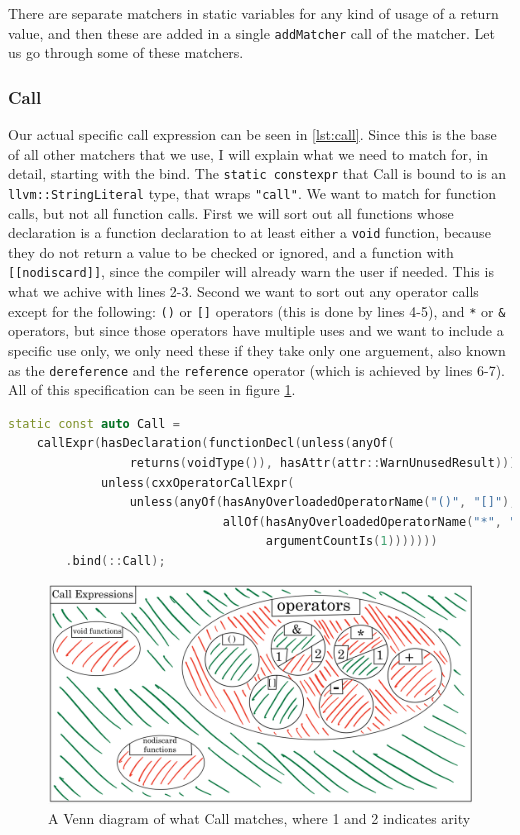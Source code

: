 There are separate matchers in static variables for any kind of usage of a return value, and then these are added in a single
\texttt{addMatcher} call of the matcher. Let us go through some of these matchers.

\subsubsection{Call}

Our actual specific call expression can be seen in \cref{lst:call}. Since this is the base of all other matchers
that we use, I will explain what we need to match for, in detail, starting with the bind. The \lstinline{static constexpr} that Call
is bound to is an \lstinline{llvm::StringLiteral} type, that wraps \texttt{"call"}.
We want to match for function calls, but not all function calls. First we will sort out all functions whose declaration is a function
declaration to at least either a \lstinline{void} function, because they do not return a value to be checked or ignored, and a
function with \texttt{[[nodiscard]]}, since the compiler will already warn the user if needed. This is what we achive with lines
2-3. Second we want to sort out any operator calls except for the following: \lstinline{()} or \lstinline{[]} operators
(this is done by lines 4-5), and \lstinline{*} or \lstinline{&} operators, but since those operators have multiple uses and
we want to include a specific use only, we only need these if they take only one arguement, also known as the \texttt{dereference}
and the \texttt{reference} operator (which is achieved by lines 6-7).
All of this specification can be seen in figure \cref{fig:venn call}.


\begin{lstlisting}[language={C++},caption={The matcher for our desired call expression.},label={lst:call}]
static const auto Call =
	callExpr(hasDeclaration(functionDecl(unless(anyOf(
				 returns(voidType()), hasAttr(attr::WarnUnusedResult))))),
			 unless(cxxOperatorCallExpr(
				 unless(anyOf(hasAnyOverloadedOperatorName("()", "[]"),
							  allOf(hasAnyOverloadedOperatorName("*", "&"),
									argumentCountIs(1)))))))
		.bind(::Call);
\end{lstlisting}

\begin{figure}[H]
	\includegraphics[width=\linewidth]{images/venn_call.png}
	\caption{A Venn diagram of what Call matches, where 1 and 2 indicates arity}
	\label{fig:venn call}
\end{figure}

